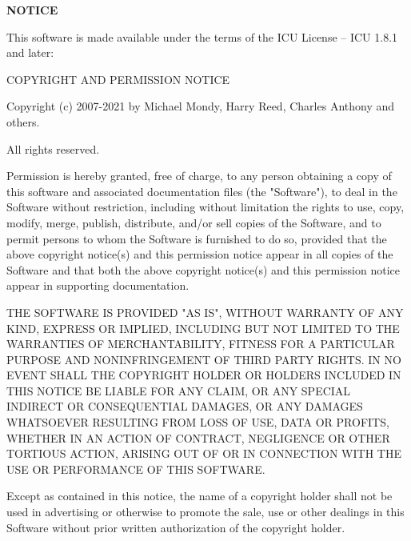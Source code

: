 \begin{center}
	\Large\bfseries NOTICE
\end{center}

\begin{center}
This software is made available under the terms of the ICU License -- ICU 1.8.1 and later:

COPYRIGHT AND PERMISSION NOTICE

Copyright (c) 2007-2021 by Michael Mondy, Harry Reed, Charles Anthony and
others.

All rights reserved.
\end{center}

Permission is hereby granted, free of charge, to any person obtaining a copy of
this software and associated documentation files (the "Software"), to deal in
the Software without restriction, including without limitation the rights to
use, copy, modify, merge, publish, distribute, and/or sell copies of the
Software, and to permit persons to whom the Software is furnished to do so,
provided that the above copyright notice(s) and this permission notice appear
in all copies of the Software and that both the above copyright notice(s) and
this permission notice appear in supporting documentation.

THE SOFTWARE IS PROVIDED "AS IS", WITHOUT WARRANTY OF ANY KIND, EXPRESS OR
IMPLIED, INCLUDING BUT NOT LIMITED TO THE WARRANTIES OF MERCHANTABILITY,
FITNESS FOR A PARTICULAR PURPOSE AND NONINFRINGEMENT OF THIRD PARTY RIGHTS. IN
NO EVENT SHALL THE COPYRIGHT HOLDER OR HOLDERS INCLUDED IN THIS NOTICE BE
LIABLE FOR ANY CLAIM, OR ANY SPECIAL INDIRECT OR CONSEQUENTIAL DAMAGES, OR ANY
DAMAGES WHATSOEVER RESULTING FROM LOSS OF USE, DATA OR PROFITS, WHETHER IN AN
ACTION OF CONTRACT, NEGLIGENCE OR OTHER TORTIOUS ACTION, ARISING OUT OF OR IN
CONNECTION WITH THE USE OR PERFORMANCE OF THIS SOFTWARE.

Except as contained in this notice, the name of a copyright holder shall not be
used in advertising or otherwise to promote the sale, use or other dealings in
this Software without prior written authorization of the copyright holder.

